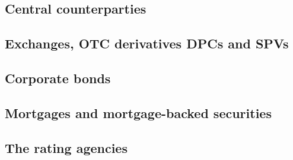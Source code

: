 \subsection{Central counterparties}
\subsection{Exchanges, OTC derivatives DPCs and SPVs}
\subsection{Corporate bonds}
\subsection{Mortgages and mortgage-backed securities}
\subsection{The rating agencies}